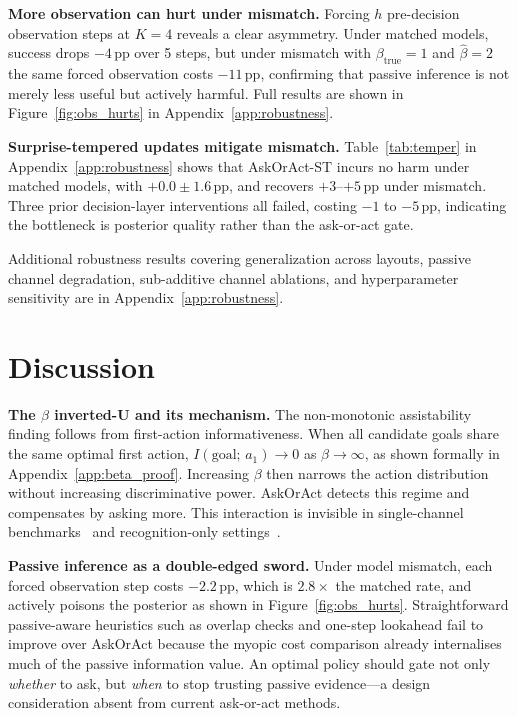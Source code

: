\documentclass[10pt,twocolumn]{article}
\begin{document}
\textbf{More observation can hurt under mismatch.}
Forcing $h$ pre-decision observation steps at $K{=}4$ reveals a clear asymmetry. Under matched models, success drops $-4$\,pp over 5 steps, but under mismatch with $\beta_\text{true}{=}1$ and $\hat\beta{=}2$ the same forced observation costs $-11$\,pp, confirming that passive inference is not merely less useful but actively harmful. Full results are shown in Figure~\ref{fig:obs_hurts} in Appendix~\ref{app:robustness}.

\textbf{Surprise-tempered updates mitigate mismatch.}
Table~\ref{tab:temper} in Appendix~\ref{app:robustness} shows that AskOrAct-ST incurs no harm under matched models, with $+0.0 \pm 1.6$\,pp, and recovers $+3$--$+5$\,pp under mismatch.
Three prior decision-layer interventions all failed, costing $-1$ to $-5$\,pp, indicating the bottleneck is posterior quality rather than the ask-or-act gate.

Additional robustness results covering generalization across layouts, passive channel degradation, sub-additive channel ablations, and hyperparameter sensitivity are in Appendix~\ref{app:robustness}.

\section{Discussion}

\textbf{The $\beta$ inverted-U and its mechanism.}
The non-monotonic assistability finding follows from first-action informativeness. When all candidate goals share the same optimal first action, $I(\text{goal};\, a_1) \to 0$ as $\beta \to \infty$, as shown formally in Appendix~\ref{app:beta_proof}.
Increasing $\beta$ then narrows the action distribution without increasing discriminative power.
AskOrAct detects this regime and compensates by asking more.
This interaction is invisible in single-channel benchmarks~\cite{kobalczyk2025active,grand2026shoot,tan2024clips} and recognition-only settings~\cite{keren2014grd,zhang2025pagr}.

\textbf{Passive inference as a double-edged sword.}
Under model mismatch, each forced observation step costs $-2.2$\,pp, which is $2.8\times$ the matched rate, and actively poisons the posterior as shown in Figure~\ref{fig:obs_hurts}.
Straightforward passive-aware heuristics such as overlap checks and one-step lookahead fail to improve over AskOrAct because the myopic cost comparison already internalises much of the passive information value.
An optimal policy should gate not only \emph{whether} to ask, but \emph{when} to stop trusting passive evidence---a design consideration absent from current ask-or-act methods.
\end{document}
